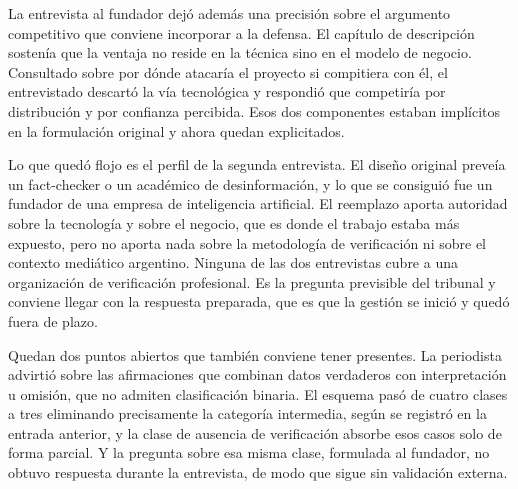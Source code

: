 La entrevista al fundador dejó además una precisión sobre el argumento competitivo que conviene incorporar a la defensa. El capítulo de descripción sostenía que la ventaja no reside en la técnica sino en el modelo de negocio. Consultado sobre por dónde atacaría el proyecto si compitiera con él, el entrevistado descartó la vía tecnológica y respondió que competiría por distribución y por confianza percibida. Esos dos componentes estaban implícitos en la formulación original y ahora quedan explicitados.

Lo que quedó flojo es el perfil de la segunda entrevista. El diseño original preveía un fact-checker o un académico de desinformación, y lo que se consiguió fue un fundador de una empresa de inteligencia artificial. El reemplazo aporta autoridad sobre la tecnología y sobre el negocio, que es donde el trabajo estaba más expuesto, pero no aporta nada sobre la metodología de verificación ni sobre el contexto mediático argentino. Ninguna de las dos entrevistas cubre a una organización de verificación profesional. Es la pregunta previsible del tribunal y conviene llegar con la respuesta preparada, que es que la gestión se inició y quedó fuera de plazo.

Quedan dos puntos abiertos que también conviene tener presentes. La periodista advirtió sobre las afirmaciones que combinan datos verdaderos con interpretación u omisión, que no admiten clasificación binaria. El esquema pasó de cuatro clases a tres eliminando precisamente la categoría intermedia, según se registró en la entrada anterior, y la clase de ausencia de verificación absorbe esos casos solo de forma parcial. Y la pregunta sobre esa misma clase, formulada al fundador, no obtuvo respuesta durante la entrevista, de modo que sigue sin validación externa.

\bigskip
